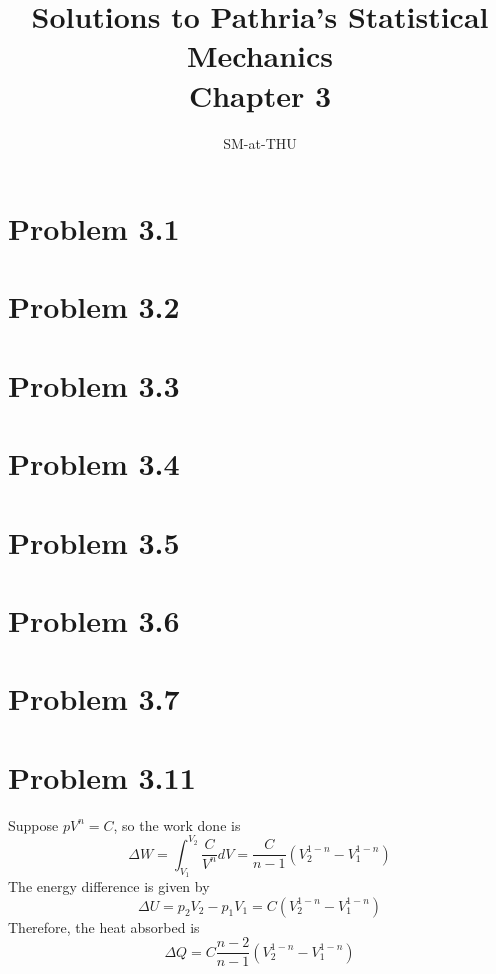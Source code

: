\documentclass{article}
\author{SM-at-THU}
\title{\bf{Solutions to Pathria's Statistical Mechanics}\\Chapter 3}
\begin{document}
\maketitle

\section*{Problem 3.1}

\section*{Problem 3.2}

\section*{Problem 3.3}

\section*{Problem 3.4}

\section*{Problem 3.5}

\section*{Problem 3.6}

\section*{Problem 3.7}

\section*{Problem 3.11}
Suppose $pV^{n} = C$, so the work done is
\begin{equation}
\Delta W = \int^{V_{2}}_{V_{1}} \frac{C}{V^{n}} dV = \frac{C}{n-1} (V^{1-n}_{2} - V^{1-n}_{1})
\end{equation}
The energy difference is given by
\begin{equation}
\Delta U = p_{2}V_{2} - p_{1}V_{1} = C (V^{1-n}_{2} - V^{1-n}_{1})
\end{equation}
Therefore, the heat absorbed is
\begin{equation}
\Delta Q =  C\frac{n-2}{n-1} (V^{1-n}_{2} - V^{1-n}_{1})
\end{equation}
\end{document}
